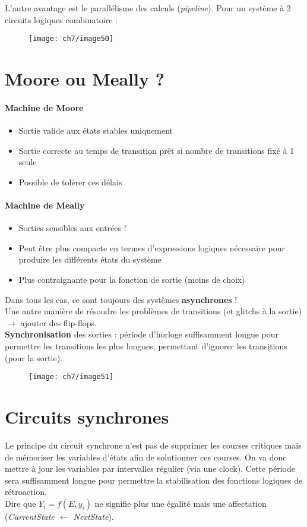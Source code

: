 L'autre avantage est le parallélisme des calculs (\textit{pipeline}). Pour un système à 2 circuits logiques combinatoire :
\begin{figure}[H] 
	\centering 
	\texttt{[image: ch7/image50]} 
\end{figure}
\section{Moore ou Meally ?}
\begin{multicols}{2}
	\paragraph{Machine de Moore}
	\begin{itemize}
		\item Sortie valide aux états stables uniquement
		\item Sortie correcte au temps de transition prêt si nombre de transitions fixé à 1 seule
		\item Possible de tolérer ces délais
	\end{itemize}
	\columnbreak
	\paragraph{Machine de Meally}
	\begin{itemize}
		\item Sorties sensibles aux entrées !
		\item Peut être plus compacte en termes d'expressions logiques nécessaire pour produire les différents états du système
		\item Plus contraignante pour la fonction de sortie (moins de choix)
	\end{itemize}
\end{multicols}
Dans tous les  cas, ce sont toujours des systèmes \textbf{asynchrones} !\\

Une autre manière de résoudre les problèmes de transitions (et glitchs à la sortie) $\rightarrow$ ajouter des flip-flops.\\ \textbf{Synchronisation} des sorties : période d'horloge suffisamment longue pour permettre les transitions les plus longues, permettant d'ignorer les transitions (pour la sortie).
\begin{figure}[H] 
	\centering 
	\texttt{[image: ch7/image51]} 
\end{figure}
\section{Circuits synchrones}
Le principe du circuit synchrone n'est pas de supprimer les courses critiques mais de mémoriser les variables d'états afin de solutionner ces courses. On va donc mettre à jour les variables par intervalles régulier (via une clock). Cette période sera suffisamment longue pour permettre la stabilisation des fonctions logiques de rétroaction.\\
Dire que $Y_i=f(E,y_i)$ ne signifie plus une égalité mais une affectation (\textit{CurrentState $\leftarrow$ NextState}).\\

